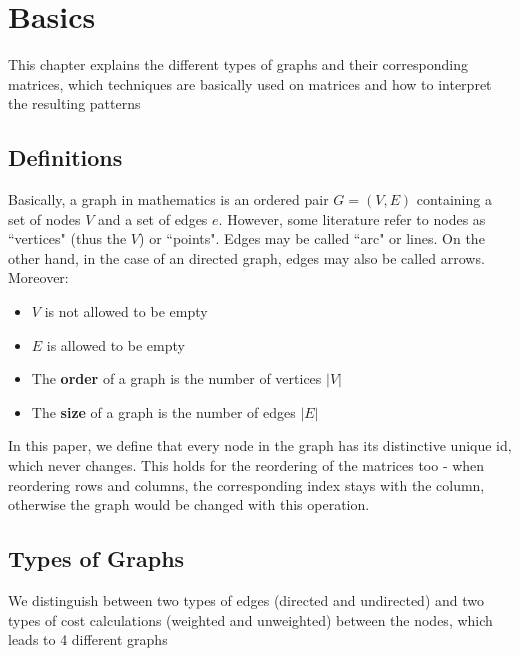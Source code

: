 %
%
% 
% 
% 


\chapter{Basics}\label{chap:Basics}


This chapter explains the different types of graphs and their corresponding matrices, which techniques are basically used on matrices and how to interpret the resulting patterns

\section{Definitions}
Basically, a graph in mathematics is an ordered pair $G = (V, E)$ containing a set of nodes $V$ and a set of edges $e$. However, some literature refer to nodes as ``vertices" (thus the $V$) or ``points".
Edges may be called ``arc" or lines. 
On the other hand, in the case of an directed graph, edges may also be called arrows. Moreover: \begin{itemize}
	\item $V$ is not allowed to be empty
	\item $E$ is allowed to be empty
	\item The \textbf{order} of a graph is the number of vertices $|V|$
	\item The \textbf{size} of a graph is the number of edges $|E|$
\end{itemize}

In this paper, we define that every node in the graph has its distinctive unique id, which never changes. This holds for the reordering of the matrices too - when reordering rows and columns, the corresponding index stays with the column, otherwise the graph would be changed with this operation.



\section{Types of Graphs}

We distinguish between two types of edges (directed and undirected) and two types of cost calculations (weighted and unweighted) between the nodes, which leads to 4 different graphs

